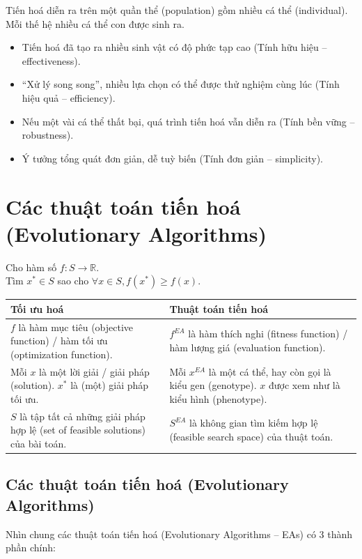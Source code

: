 \documentclass{book}
\begin{document}
Tiến hoá diễn ra trên một quần thể (population) gồm nhiều
cá thể (individual). Mỗi thế hệ nhiều cá thể con được sinh ra.
\begin{itemize}
    \item Tiến hoá đã tạo ra nhiều sinh vật có độ phức tạp cao (Tính
    hữu hiệu – effectiveness).
    \item “Xử lý song song”, nhiều lựa chọn có thể được thử nghiệm
    cùng lúc (Tính hiệu quả – 
    efficiency).
    \item Nếu một vài cá thể thất bại, quá trình tiến hoá vẫn diễn ra
    (Tính bền vững – robustness).
    \item Ý tưởng tổng quát đơn giản, dễ tuỳ biến (Tính đơn giản –
    simplicity).
\end{itemize}

\section*{Các thuật toán tiến hoá (Evolutionary Algorithms)}

Cho hàm số $f: S \rightarrow \mathbb{R}$. \\
Tìm $x^* \in S$ sao cho $\forall x \in S, f(x^*) \ge f(x)$.

\begin{tabular}{|p{}|p{}|}
\hline
\textbf{Tối ưu hoá} & \textbf{Thuật toán tiến hoá} \\
\hline
$f$ là hàm mục tiêu (objective function) / hàm tối ưu (optimization function). & $f^{EA}$ là hàm thích nghi (fitness function) / hàm lượng giá (evaluation function). \\
\hline
Mỗi $x$ là một lời giải / giải pháp (solution). $x^*$ là (một) giải pháp tối ưu. & Mỗi $x^{EA}$ là một cá thể, hay còn gọi là kiểu gen (genotype). $x$ được xem như là kiểu hình (phenotype). \\
\hline
$S$ là tập tất cả những giải pháp hợp lệ (set of feasible solutions) của bài toán. & $S^{EA}$ là không gian tìm kiếm hợp lệ (feasible search space) của thuật toán. \\
\hline
\end{tabular}

\subsection{Các thuật toán tiến hoá (Evolutionary Algorithms)}
Nhìn chung các thuật toán tiến hoá (Evolutionary Algorithms
– EAs) có 3 thành phần chính:
\end{document}
